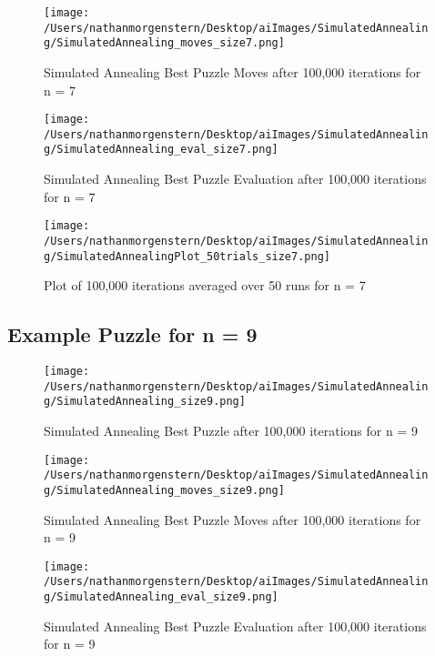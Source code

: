 \documentclass{report}
\begin{document}
	\begin{figure}[H]
	\centering
	\texttt{[image: /Users/nathanmorgenstern/Desktop/aiImages/SimulatedAnnealing/SimulatedAnnealing\_moves\_size7.png]}
	\caption{Simulated Annealing Best Puzzle Moves after 100,000 iterations for n = 7} 
	\label{fig: Simulated Annealing Best Puzzle Moves after 100,000 iterations for n = 7}
	\end{figure}

	\begin{figure}[H]
	\centering
	\texttt{[image: /Users/nathanmorgenstern/Desktop/aiImages/SimulatedAnnealing/SimulatedAnnealing\_eval\_size7.png]}
	\caption{Simulated Annealing Best Puzzle Evaluation after 100,000 iterations for n = 7} 
	\label{fig: Simulated Annealing Best Puzzle Evaluation after 100,000 iterations for n = 7} 
	\end{figure}

	\begin{figure}[H]
	\centering
	\texttt{[image: /Users/nathanmorgenstern/Desktop/aiImages/SimulatedAnnealing/SimulatedAnnealingPlot\_50trials\_size7.png]}
	\caption{Plot of 100,000 iterations averaged over 50 runs for n = 7}
	\label{fig: Plot of 100,000 iterations averaged over 50 runs for n = 7}
	\end{figure}


\subsection{Example Puzzle for n = 9}
	
	\begin{figure}[H]
	\centering
	\texttt{[image: /Users/nathanmorgenstern/Desktop/aiImages/SimulatedAnnealing/SimulatedAnnealing\_size9.png]}
	\caption{Simulated Annealing Best Puzzle after 100,000 iterations for n = 9} 
	\label{fig: Simulated Annealing Best Puzzle after 100,000 iterations for n = 9}
	\end{figure}
	
	\begin{figure}[H]
	\centering
	\texttt{[image: /Users/nathanmorgenstern/Desktop/aiImages/SimulatedAnnealing/SimulatedAnnealing\_moves\_size9.png]}
	\caption{Simulated Annealing Best Puzzle Moves after 100,000 iterations for n = 9} 
	\label{fig: Simulated Annealing Best Puzzle Moves after 100,000 iterations for n = 9}
	\end{figure}

	\begin{figure}[H]
	\centering
	\texttt{[image: /Users/nathanmorgenstern/Desktop/aiImages/SimulatedAnnealing/SimulatedAnnealing\_eval\_size9.png]}
	\caption{Simulated Annealing Best Puzzle Evaluation after 100,000 iterations for n = 9} 
	\label{fig: Simulated Annealing Best Puzzle Evaluation after 100,000 iterations for n = 9} 
	\end{figure}
\end{document}
